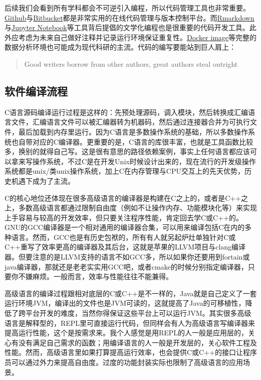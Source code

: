 \documentclass[]{tufte-book}
\begin{document}
后续我们会看到所有学科都会不可逆引入编程，所以代码管理工具也非常重要。\href{https://github.com/}{Github}与\href{https://bitbucket.org/}{Bitbucket}都是非常实用的在线代码管理与版本控制平台。而\href{https://rmarkdown.rstudio.com/}{Rmarkdown}与\href{https://ipython.org/notebook.html}{Jupyter Notebook}等工具背后提倡的文学化编程也是很重要的代码开发工具。此外应考虑为未来自己做好注释并记录运行环境保证重复性。\href{https://docs.docker.com/get-started/}{Docker image}等完整的数据分析环境也可能成为现代科研的主流。代码的编写要能站到巨人肩上：

\begin{quote}
Good writers borrow from other authors, great authors steal outright
\end{quote}

\hypertarget{ux8f6fux4ef6ux7f16ux8bd1ux6d41ux7a0b}{%
\subsection{软件编译流程}\label{ux8f6fux4ef6ux7f16ux8bd1ux6d41ux7a0b}}

C语言源码编译运行过程是这样的：先预处理源码，调入模块，然后转换成汇编语言文件，汇编语言文件可以被汇编器转为机器码，然后通过连接器合并为可执行文件，最后加载到内存里运行。因为C语言是多数操作系统的基础，所以多数操作系统也自带对应的C编译器。更重要的是，C语言的库很丰富，也就是工具函数比较多，换别的就得自己写。这是很有意思的路径依赖案例，事实上任何语言都应该可以拿来写操作系统，不过C是在开发Unix时候设计出来的，现在流行的开发级操作系统都是unix/类unix操作系统，加上C在内存管理与CPU交互上的先天优势，历史机遇下成为了主流。

C的核心地位还体现在很多高级语言的编译器是构建在C之上的，或者是C++之上，多数高级语言都通过限制自由度（例如不让操作内存、功能模块化等）来实现上手容易与较高的开发效率，但只要关注程序性能，肯定回去学C或C++的。GNU的GCC编译器是一个相对通用的编译器合集，可以用来编译包括C在内的多种语言。然而，GCC也是有历史包袱的，所有有人就另起炉灶单独针对C或C++重写了效率更高的编译器及其后台，这就是苹果的LLVM项目与clang编译器。但要注意的是LLVM支持的语言不如GCC多，所以如果你还要用到fortain或java编译器，那就还是老老实实用GCC吧，或者cmake的时候分别指定编译器，只要你不嫌麻烦。一般而言，效率与性能往往不能兼得。

高级语言的编译过程跟相对底层的C或C++是不一样的，Java就是自己定义了一套运行环境JVM，编译出的文件也是JVM可读的，这就提高了Java的可移植性，降低了跨平台开发的难度，当然你得保证这些平台上可以运行JVM。其实很多高级语言是解释型的，REPL里可直接运行代码，但同样会有人为高级语言写编译器来提高运行性能，这个是按需求来。我个人感觉是用REPL的人一般是应用层的，关心有没有满足自己需求的函数；用编译语言的人一般是开发层的，关心软件工程及性能。然而，高级语言里如果打算提高运行效率，也会提供C或C++的接口让程序员可以通过外力来提高自由度。过度的功能封装实际也限制了高级语言的应用场景。
\end{document}
